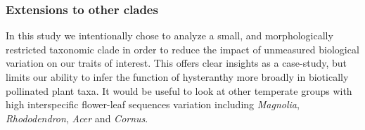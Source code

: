 \documentclass{article}[11pt]
\begin{document}
\subsubsection*{Extensions to other clades}
In this study we intentionally chose to analyze a small, and morphologically restricted taxonomic clade in order to reduce the impact of unmeasured biological variation on our traits of interest. This offers clear insights as a case-study, but limits our ability to infer the function of hysteranthy more broadly in biotically pollinated plant taxa. It would be useful to look at other temperate  groups with high interspecific flower-leaf sequences variation including \emph{Magnolia}, \emph{Rhododendron}, \emph{Acer} and \emph{Cornus}. %

%


\end{document}
